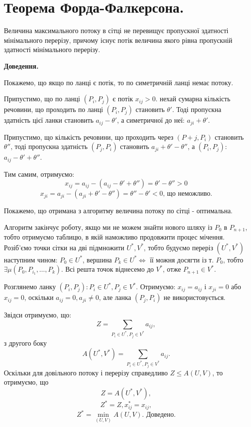 \documentclass[12pt,a4paper]{report}
\begin{document}
\section{Теорема Форда-Фалкерсона.}

Величина максимального потоку в сітці не перевищує пропускної здатності мінімального перерізу, причому існує потік величина якого рівна пропускній здатності мінімального перерізу.

{\bf Доведення.}

Покажемо, що якщо по ланці є потік, то по симетричній ланці немає потоку.

Припустимо, що по ланці $(P_i, P_j)$ є потік $x_{ij}>0$. нехай сумарна кількість речовини, що проходить по ланці $(P_i, P_j)$ становить $\theta'$. Тоді пропускна здатність цієї ланки становить $a_{ij} - \theta'$, а симетричної до неї: $a_{ji} + \theta'$.

Припустимо, що кількість речовини, що проходить через $(P+j, P_i)$ становить $\theta''$, тоді пропускна здатність $(P_j, P_i)$ становить $a_{ji}+\theta'-\theta''$, а $(P_i, P_j)$: $a_{ij}-\theta'+\theta''$.

Тим самим, отримуємо:
\[ x_{ij} = a_{ij} - (a_{ij} - \theta' + \theta'') = \theta' - \theta'' > 0 \]
\[ x_{ji} = a_{ji} - (a_{ji} + \theta' - \theta'') = \theta'' - \theta' < 0 \mbox{, що неможливо.}\]

Покажемо, що отримана з алгоритму величина потоку по сітці - оптимальна.

Алгоритм закінчує роботу, якщо ми не можем знайти нового шляху із $P_0$ в $P_{n+1}$, тобто отримуємо таблицю, в якій наможливо продовжити процес мічення. Розіб’ємо точки сітки на дві підмножити $U^*, V^*$, тобто будуємо переріз $(U^*, V^*)$ наступним чином: $P_0 \in U^*$, вершина $P_k \in U^* \Leftrightarrow$ її можня досягти із т. $P_0$, тобто $\exists \mu(P_0, P_{i_1}, \dots, P_k)$. Всі решта точок віднесемо до $V^*$, отже $P_{n+1} \in V^*$.

Розглянемо ланку $(P_i, P_j): P_i \in U^*, P_j \in V^*$. Отримуємо: $x_{ij}=a_{ij}$ і $x_{ji}=0$ або $x_{ij}=0$, оскільки $a_{ij}=0, a_{ji} \neq 0$, але ланка $(P_j, P_i)$ не використовується.

Звідси отримуємо, що: 
\[ Z= \sum_{P_i \in U^*, P_j \in V^*} a_{ij}, \]
з другого боку
\[ A(U^*, V^*) = \sum_{P_i \in U^*, P_j \in V^*} a_{ij}. \]
Оскільки для довільного потоку і перерізу справедливо $Z \leq A(U, V)$, то отримуємо, що 
\[ Z = A(U^*, V^*), \]
\[ Z^*=Z, x_{ij}^*=x_{ij}, \]
\[ Z^*=\min_{(U,V)} A(U,V). \mbox{ Доведено.}\]
\end{document}

